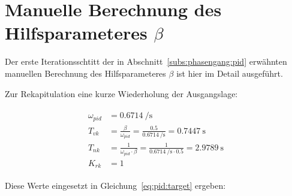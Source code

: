 \section{Manuelle Berechnung des Hilfsparameteres $\beta$}
\label{app:beta_manual_calculation}

Der   erste  Iterationsschtitt   der  in   Abschnitt~\ref{subs:phasengang:pid}
erw\"ahnten  manuellen Berechnung  des  Hilfsparameteres $\beta$  ist hier  im
Detail ausgef\"uhrt.

Zur  Rekapitulation   eine  kurze   Wiederholung  der   Ausgangslage:

\begin{gather} \label{eq:app:recap}
    \begin{split}
        \omega_{pid} & = \SI{0.6714}{\per\second} \\
        {T_{vk}}     & = \frac{\beta}{\omega_{pid}}  = \frac{0.5}{\SI{0.6714}{\per\second}}                   = \SI{0.7447}{\second} \\
        {T_{nk}}     & = \frac{1}{\omega_{pid} \cdot \beta} = \frac{1}{\SI{0.6714}{\per\second} \cdot 0.5 }  = \SI{2.9789}{\second}  \\
        K_{rk}       & = 1
    \end{split}
\end{gather}

Diese Werte eingesetzt in Gleichung~\ref{eq:pid:target} ergeben:

